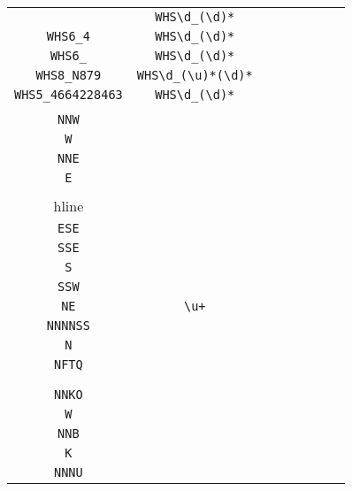 \begin{longtable}{cccccccc}
\begin{tabular}{ll}
    \verb|WHS5_79| & \verb|WHS\d_(\d)*|\\
\verb|WHS6_4| & \verb|WHS\d_(\d)*|\\
\verb|WHS6_| & \verb|WHS\d_(\d)*|\\
\verb|WHS8_N879| & \verb|WHS\d_(\u)*(\d)*|\\
\verb|WHS5_4664228463| & \verb|WHS\d_(\d)*|
\end{tabular}
\\\midrule 
\begin{tabular}{l}
    \verb|WSW|\\
\verb|NNW|\\
\verb|W|\\
\verb|NNE|\\
\verb|E|\\
\\hline\\
\verb|ESE|\\
\verb|SSE|\\
\verb|S|\\
\verb|SSW|\\
\verb|NE|
\end{tabular}

&
\verb|\u+|
&

\begin{tabular}{l}
    \verb|(N)*(\u)*|\\
\verb|NNNNSS|\\
\verb|N|\\
\verb|NFTQ|\\
\verb||\\
\verb||
\end{tabular}

&

\begin{tabular}{l}
    \verb|(N)*(\u)*\u|\\
\verb|NNKO|\\
\verb|W|\\
\verb|NNB|\\
\verb|K|\\
\verb|NNNU|
\end{tabular}

&


\end{longtable}
